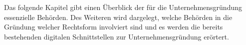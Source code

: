 

Das folgende Kapitel gibt einen Überblick der für die Unternehmensgründung essenzielle Behörden. 
Des Weiteren wird dargelegt, welche Behörden in die Gründung welcher Rechtsform involviert sind und 
es werden die bereits bestehenden digitalen Schnittstellen zur Unternehmensgründung erörtert.

